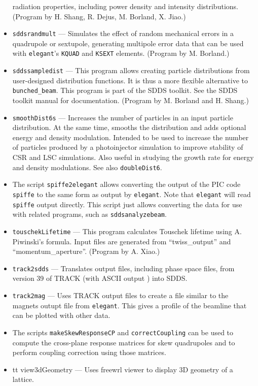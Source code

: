 \documentclass[11pt]{article}
\begin{document}
\begin{itemize}
  radiation properties, including power density and intensity distributions.  (Program by H. Shang, R. Dejus, M. Borland, X. Jiao.)
\item {\tt sddsrandmult} --- Simulates the effect of random mechanical errors in a quadrupole or sextupole,
  generating multipole error data that can be used with {\tt elegant}'s {\tt KQUAD} and {\tt KSEXT}
  elements. (Program by M. Borland.)
\item {\tt sddssampledist} --- This program allows creating particle
        distributions from user-designed distribution functions.  It is thus a more flexible alternative
        to \verb|bunched_beam|.  This program is part of the SDDS toolkit.  See the SDDS toolkit
        manual for documentation.  (Program by M. Borland and H. Shang.)
\item {\tt smoothDist6s} --- Increases the number of particles in an input particle distribution.  At the same
 time, smooths the distribution and adds optional energy and density modulation.   Intended to be used to increase the number of particles
 produced by a photoinjector simulation to improve stability of CSR and LSC simulations.  Also useful in studying 
 the growth rate for energy and density modulations.  See also {\tt doubleDist6}.
\item The script \verb|spiffe2elegant| allows converting the output of the PIC code \verb|spiffe| to the same form
  as output by \verb|elegant|.  Note that \verb|elegant| will read \verb|spiffe| output directly. This script just allows converting the
  data for use with related programs, such as \verb|sddsanalyzebeam|.
\item {\tt touschekLifetime} --- This program calculates Touschek lifetime using A. Piwinski's formula.
        Input files are generated from ``twiss\_output'' and ``momentum\_aperture''.  (Program by A. Xiao.)
\item {\tt track2sdds} --- Translates output files, including phase space files, from version 39 of TRACK (with ASCII output \cite{TRACK})
  into SDDS. 
\item {\tt track2mag} --- Uses TRACK output files to create a file similar to the magnets outupt file from {\tt elegant}.
  This gives a profile of the beamline that can be plotted with other data.
\item The scripts \verb|makeSkewResponseCP| and \verb|correctCoupling| can be used to compute the cross-plane response
  matrices for skew quadrupoles and to perform coupling correction using those matrices.
\item {tt view3dGeometry} --- Uses freewrl viewer to display 3D geometry of a lattice. 
\end{itemize}
\end{document}
